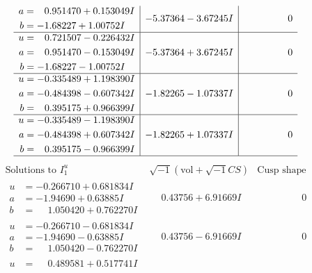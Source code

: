 \documentclass[1p]{elsarticle_modified}
\theoremstyle{definition}
\newcommand{\I}{\sqrt{-1}}
\begin{document}
$$\begin{array}{c|c|c}
\begin{aligned}
a &= \phantom{-}0.951470 + 0.153049 I \\
b &= -1.68227 + 1.00752 I\end{aligned}
 & -5.37364 - 3.67245 I & \phantom{-0.000000 } 0 \\ \hline\begin{aligned}
u &= \phantom{-}0.721507 - 0.226432 I \\
a &= \phantom{-}0.951470 - 0.153049 I \\
b &= -1.68227 - 1.00752 I\end{aligned}
 & -5.37364 + 3.67245 I & \phantom{-0.000000 } 0 \\ \hline\begin{aligned}
u &= -0.335489 + 1.198390 I \\
a &= -0.484398 - 0.607342 I \\
b &= \phantom{-}0.395175 + 0.966399 I\end{aligned}
 & -1.82265 - 1.07337 I & \phantom{-0.000000 } 0 \\ \hline\begin{aligned}
u &= -0.335489 - 1.198390 I \\
a &= -0.484398 + 0.607342 I \\
b &= \phantom{-}0.395175 - 0.966399 I\end{aligned}
 & -1.82265 + 1.07337 I & \phantom{-0.000000 } 0\\
 \hline 
 \end{array}$$\newpage$$\begin{array}{c|c|c}  
\text{Solutions to }I^u_{1}& \I (\text{vol} + \sqrt{-1}CS) & \text{Cusp shape}\\
 \hline 
\begin{aligned}
u &= -0.266710 + 0.681834 I \\
a &= -1.94690 + 0.63885 I \\
b &= \phantom{-}1.050420 + 0.762270 I\end{aligned}
 & \phantom{-}0.43756 + 6.91669 I & \phantom{-0.000000 } 0 \\ \hline\begin{aligned}
u &= -0.266710 - 0.681834 I \\
a &= -1.94690 - 0.63885 I \\
b &= \phantom{-}1.050420 - 0.762270 I\end{aligned}
 & \phantom{-}0.43756 - 6.91669 I & \phantom{-0.000000 } 0 \\ \hline\begin{aligned}
u &= \phantom{-}0.489581 + 0.517741 I \\

\end{aligned}
\end{array}$$
\end{document}

